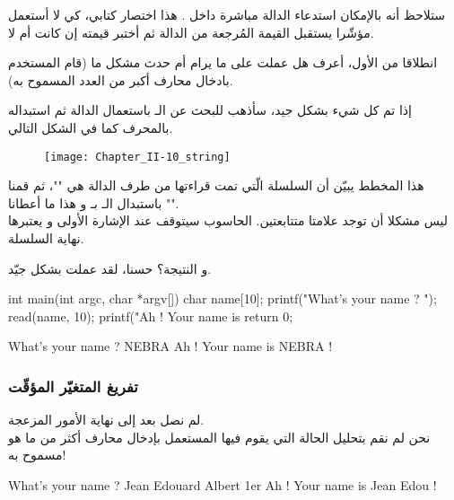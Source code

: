 ستلاحظ أنه بالإمكان استدعاء الدالة
مباشرة داخل
.
هذا اختصار كتابي، كي لا أستعمل مؤشّرا يستقبل القيمة المُرجعة من الدالة ثم أختبر قيمته إن كانت
أم لا.

انطلاقا من
الأول، أعرف هل
عملت على ما يرام أم حدث مشكل ما (قام المستخدم بادخال محارف أكبر من العدد المسموح به).

إذا تم كل شيء بشكل جيد، سأذهب للبحث عن الـ
باستعمال الدالة
ثم استبداله بالمحرف
كما في الشكل التالي.

\begin{figure}[H]
	\centering
	\texttt{[image: Chapter\_II-10\_string]}
\end{figure}

هذا المخطط يبيّن أن السلسلة الّتي تمت قراءتها من طرف الدالة
هي
""،
ثم قمنا باستبدال الـ
بـ
و هذا ما أعطانا
"".\\
ليس مشكلا أن توجد علامتا
متتابعتين. الحاسوب سيتوقف عند الإشارة الأولى و يعتبرها نهاية السلسلة.

و النتيجة؟ حسنا، لقد عملت بشكل جيّد.

\begin{Csource}
  int main(int argc, char *argv[])
  {
  	char name[10];
  	printf("What's your name ? ");
  	read(name, 10);
  	printf("Ah ! Your name is %
  	return 0;
  }
\end{Csource}

\begin{Console}
What's your name ? NEBRA
Ah ! Your name is NEBRA !
\end{Console}

\subsubsection{تفريغ المتغيّر المؤقّت}

لم نصل بعد إلى نهاية الأمور المزعجة.\\
نحن لم نقم بتحليل الحالة التي يقوم فيها المستعمل بإدخال محارف أكثر من ما هو مسموح به!

\begin{Console}
What's your name ? Jean Edouard Albert 1er
Ah ! Your name is Jean Edou !
\end{Console}

